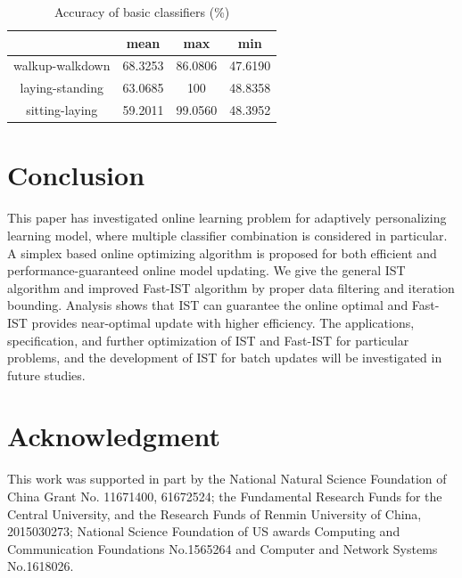 \documentclass[letterpaper]{article}
\begin{document}
\begin{table}[!hbp]
\centering
{}\label{tab}
\begin{tabular}{|c|c|c|c|}
\hline
 & mean & max & min  \\
\hline
walkup-walkdown & 68.3253 & 86.0806 & 47.6190 \\
\hline
laying-standing & 63.0685 & 100 & 48.8358  \\
\hline
sitting-laying & 59.2011 & 99.0560 & 48.3952  \\
\hline
\end{tabular}
\caption{Accuracy of basic classifiers (\%)}
\end{table}

\section{Conclusion}
This paper has investigated online learning problem for adaptively personalizing learning model, where  multiple classifier combination is considered in particular. A simplex based online optimizing algorithm is proposed for both efficient and performance-guaranteed online model updating. We give the general IST algorithm and improved Fast-IST algorithm by proper data filtering and iteration bounding. Analysis shows that IST can guarantee the online optimal and Fast-IST provides near-optimal update with higher efficiency. The applications,  specification, and further optimization of IST and Fast-IST for particular problems, and the development of IST for batch updates will be investigated in future studies.

\section{Acknowledgment}
This work was supported in part by the National Natural Science Foundation
of China Grant No. 11671400, 61672524; the Fundamental
Research Funds for the Central University, and the Research
Funds of Renmin University of China, 2015030273; National Science Foundation of US awards Computing and Communication Foundations No.1565264 and Computer and Network Systems No.1618026.




\end{document}
